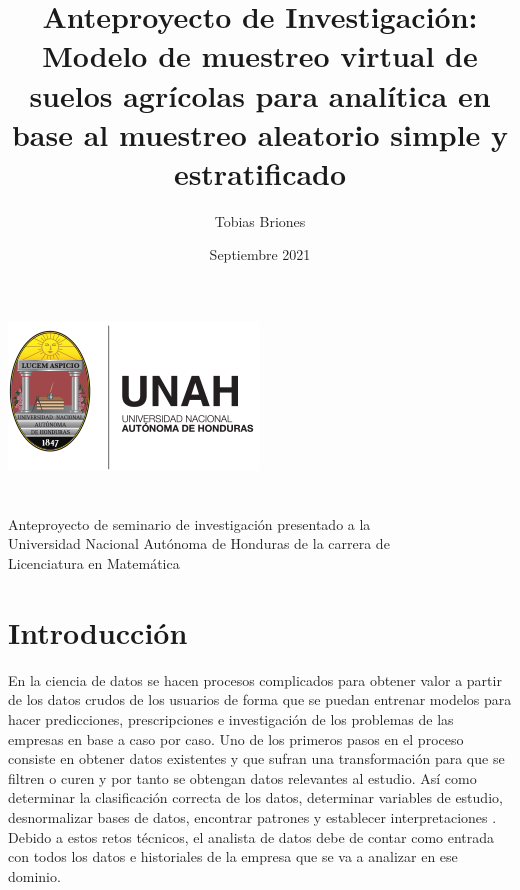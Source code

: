 \documentclass{report}
\title{Anteproyecto de Investigación: Modelo de muestreo virtual de suelos agrícolas para analítica en base al muestreo aleatorio simple y estratificado}
\author{Tobias Briones}
\date{Septiembre 2021}
\begin{document}
\makeatletter
    \begin{titlepage}
        \begin{center}
            \includegraphics[width=0.3\linewidth]{ref/logo-unah.png}\\[4ex]
            {\huge \bfseries \@title 
            \vspace{1cm}}\\[2ex]
            {\LARGE \@author}\\[50ex] 
            
            {\large
            Anteproyecto de seminario de investigación presentado a la\\
            Universidad Nacional Autónoma de Honduras de la carrera de\\
            Licenciatura en Matemática
            }\\[2ex]
            
            {\large \@date}
        \end{center}
    \end{titlepage}
\makeatother
\thispagestyle{empty}
\newpage

\thispagestyle{empty}
\tableofcontents
\listoffigures
\newpage

\chapter{Introducción}

En la ciencia de datos se hacen procesos complicados para obtener valor a partir de los datos crudos de los usuarios de forma que se puedan entrenar modelos para hacer predicciones, prescripciones e investigación de los problemas de las empresas en base a caso por caso. Uno de los primeros pasos en el proceso consiste en obtener datos existentes y que sufran una transformación para que se filtren o curen y por tanto se obtengan datos relevantes al estudio. Así como determinar la clasificación correcta de los datos, determinar variables de estudio, desnormalizar bases de datos, encontrar patrones y establecer  interpretaciones \cite{university-of-wisconsin-data-science-2021}. Debido a estos retos técnicos, el analista de datos debe de contar como entrada con todos los datos e historiales de la empresa que se va a analizar en ese dominio.
\end{document}
